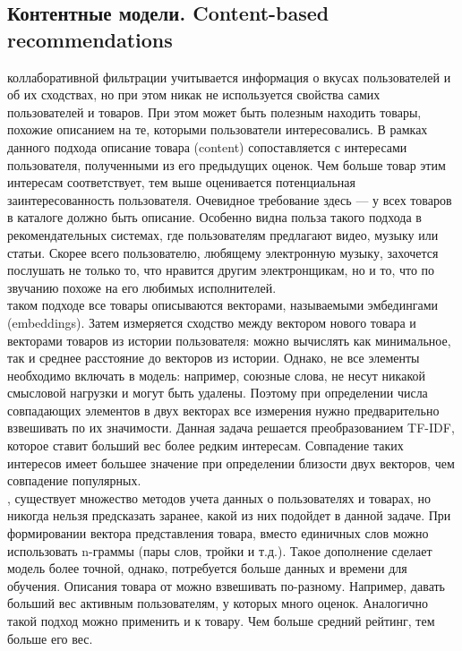 \documentclass{article}
\newcommand\tab[1][1cm]{\hspace*{#1}}
\begin{document}
\subsection{Контентные модели. Content-based recommendations}
 коллаборативной фильтрации учитывается информация о вкусах пользователей и об их сходствах, но при этом никак не используется свойства самих пользователей и товаров. При этом может быть полезным находить товары, похожие описанием на те, которыми пользователи интересовались. В рамках данного подхода описание товара (content) сопоставляется с интересами пользователя, полученными из его предыдущих оценок. Чем больше товар этим интересам соответствует, тем выше оценивается потенциальная заинтересованность пользователя. Очевидное требование здесь — у всех товаров в каталоге должно быть описание. Особенно видна польза такого подхода в рекомендательных системах, где пользователям предлагают видео, музыку или статьи. Скорее всего пользователю, любящему электронную музыку, захочется послушать не только то, что нравится другим электронщикам, но и то, что по звучанию похоже на его любимых исполнителей. \\
 таком подходе все товары описываются векторами, называемыми эмбедингами (embeddings). Затем измеряется сходство между вектором нового товара и векторами товаров из истории пользователя: можно вычислять как минимальное, так и среднее расстояние до векторов из истории. Однако, не все элементы необходимо включать в модель: например, союзные слова, не несут никакой смысловой нагрузки и могут быть удалены. Поэтому при определении числа совпадающих элементов в двух векторах все измерения нужно предварительно взвешивать по их значимости. Данная задача решается преобразованием TF-IDF, которое ставит больший вес более редким интересам. Совпадение таких интересов имеет большее значение при определении близости двух векторов, чем совпадение популярных.\\
, существует множество методов учета данных о пользователях и товарах, но никогда нельзя предсказать заранее, какой из них подойдет в данной задаче. При формировании вектора представления товара, вместо единичных слов можно использовать n-граммы (пары слов, тройки и т.д.). Такое дополнение сделает модель более точной, однако, потребуется больше данных и времени для обучения. Описания товара от можно взвешивать по-разному. Например, давать больший вес активным пользователям, у которых много оценок. Аналогично такой подход можно применить и к товару. Чем больше средний рейтинг, тем больше его вес.
\newpage
\end{document}
